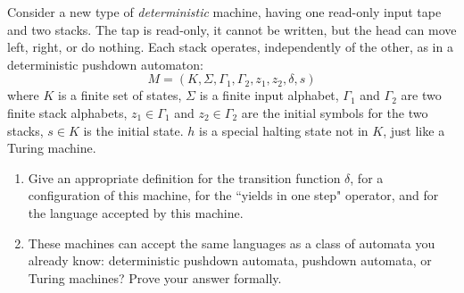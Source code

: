 \documentclass[12pt]{jhwhw}
\begin{document}
\problem{}

	Consider a new type of \textit{deterministic} machine, having one read-only input tape
	and two stacks. The tap is read-only, it cannot be written, but the head can move left, right,
	or do nothing. Each stack operates, independently of the other, as in a deterministic pushdown
	automaton:
	$$
		M = (K,\Sigma, \Gamma_1, \Gamma_2, z_1, z_2, \delta, s)
	$$
	where $K$ is a finite set of states, $\Sigma$ is a finite input alphabet,
	$\Gamma_1$ and $\Gamma_2$ are two finite stack alphabets, $z_1\in \Gamma_1$ and $z_2\in \Gamma_2$
	are the initial symbols for the two stacks, $s\in K$ is the initial state. $h$ is a special
	halting state not in $K$, just like a Turing machine.

	\begin{enumerate}
		\item Give an appropriate definition for the transition function $\delta$, for a 
			configuration of this machine, for the ``yields in one step" operator,
			and for the language accepted by this machine.
		\item These machines can accept the same languages as a class of automata you already know:
			deterministic pushdown automata, pushdown automata, or Turing machines? Prove
			your answer formally.
	\end{enumerate}

\solution
\end{document}
